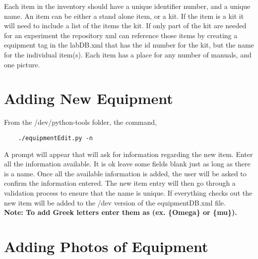 \documentclass[justified]{LabArx1_5}
\begin{document}
Each item in the inventory should have a unique identifier number, and a unique name. An item can be either a stand alone item, or a kit. If the item is a kit it will need to include a list of the items the kit. If only part of the kit are needed for an experiment the repository xml can reference those items by creating a equipment tag in the labDB.xml that has the id number for the kit, but the name for the individual item(s). Each item has a place for any number of manuals, and one picture.\\



\section{Adding New Equipment}


From the /dev/python-tools folder, the command,

	\begin{lstlisting}
	./equipmentEdit.py -n       
	\end{lstlisting}

A prompt will appear that will ask for information regarding the new item. Enter all the information available. It is ok leave some fields blank just as long as there is a name. Once all the available information is added, the user will be asked to confirm the information entered. The new item entry will then go through a validation process to ensure that the name is unique. If everything checks out the new item will be added to the /dev version of the equipmentDB.xml file.\\

{\bf Note: To add Greek letters enter them as (ex. \{Omega\} or \{mu\}).}




\section{Adding Photos of Equipment}
\end{document}
